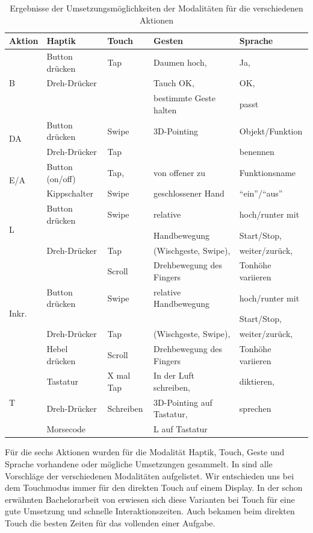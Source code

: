 \begin{table}[ht]
	\centering
	\begin{tabular}{|l|l|l|l|l|}
		\hline
		Aktion & Haptik & Touch & Gesten 			& Sprache\\
		\hline
				\multirow {3}{*}{B}
					& Button drücken		& Tap 				& Daumen hoch, 									& Ja,\\
					& Dreh-Drücker			& 						& Tauch OK, 										& OK,\\
					& 									& 						& bestimmte Geste halten 				& passt\\
		\hline
				\multirow{2}{*}{DA}
					& Button drücken		& Swipe  			& 3D-Pointing 								& Objekt/Funktion \\
					& Dreh-Drücker			& Tap					& 														& benennen \\		
		\hline
				\multirow{2}{*}{E/A}
					& Button (on/off)		& Tap,  			& von offener zu 								& Funktionsname\\
					& Kippschalter			& Swipe				& geschlossener Hand						& "`ein"'/"`aus"'\\
		\hline
				\multirow{3}{*}{L}
					& Button drücken		& Swipe				& relative  										& hoch/runter mit\\
					& 									& 						& Handbewegung									& Start/Stop,\\
					& Dreh-Drücker			& Tap 				& (Wischgeste, Swipe), 					& weiter/zurück,\\
					& 									& Scroll			& Drehbewegung des Fingers 			& Tonhöhe variieren\\		
		\hline
				\multirow{3}{*}{Inkr.}		
					& Button drücken		& Swipe				& relative Handbewegung 				& hoch/runter mit\\
					& 									& 						& 															& Start/Stop,\\
					& Dreh-Drücker			& Tap 				& (Wischgeste, Swipe), 					& weiter/zurück,\\
					& Hebel drücken			& Scroll			& Drehbewegung des Fingers			& Tonhöhe variieren\\					
		\hline
				\multirow{3}{*}{T}
					& Tastatur					& X mal Tap 	& In der Luft schreiben, 				& diktieren,\\
					& Dreh-Drücker			& Schreiben		& 3D-Pointing auf Tastatur,			& sprechen\\		
					& Morsecode					& 						& L auf Tastatur								&  \\	
		\hline			
  \end{tabular}
	\caption{Ergebnisse der Umsetzungsmöglichkeiten der Modalitäten für die verschiedenen Aktionen}
	\label{tab:table1}
\end{table}
Für die sechs Aktionen wurden für die Modalität Haptik, Touch, Geste und Sprache vorhandene oder mögliche Umsetzungen gesammelt. 
In  sind alle Vorschläge der verschiedenen Modalitäten aufgelistet.
Wir entschieden uns bei dem Touchmodus immer für den direkten Touch auf einem Display. 
In der schon erwähnten Bachelorarbeit von \citet{stracke2014touch} erwiesen sich diese Varianten bei Touch für eine gute Umsetzung und schnelle Interaktionszeiten. 
Auch \citet{Rumelin:2013} bekamen beim direkten Touch die besten Zeiten für das vollenden einer Aufgabe.

